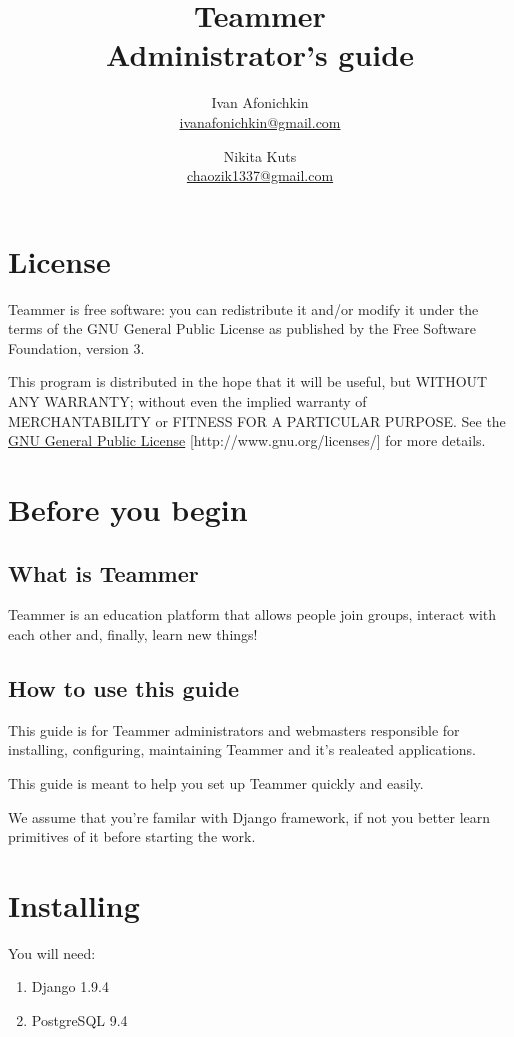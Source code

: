 \documentclass{report}
\author{Ivan Afonichkin \\ \href{mailto:ivanafonichkin@gmail.com}{ivanafonichkin@gmail.com} 
   \and Nikita Kuts \\ \href{mailto:chaozik1337@gmail.com}{chaozik1337@gmail.com} }
\title{Teammer \\ Administrator's guide}
\begin{document}
\maketitle
\tableofcontents

\section{License}
Teammer is free software: you can redistribute it and/or modify
it under the terms of the GNU General Public License as published by
the Free Software Foundation, version 3.

This program is distributed in the hope that it will be useful, but WITHOUT ANY WARRANTY; without even the implied warranty of MERCHANTABILITY or FITNESS FOR A PARTICULAR PURPOSE.  See the \href{http://www.gnu.org/licenses/}{GNU General Public License} [http://www.gnu.org/licenses/] for more details.

\section{Before you begin}
\subsection{What is Teammer}

Teammer is an education platform that allows people join groups, interact with each other and, finally, learn new things!

\subsection{How to use this guide}
This guide is for Teammer administrators and webmasters responsible for installing, configuring, maintaining Teammer and it’s realeated applications.

This guide is meant to help you set up Teammer quickly and easily.

We assume that you’re familar with Django framework, if not you better learn primitives of it before starting the work.

\section{Installing}
You will need:

\begin{enumerate}
\item Django 1.9.4
\item PostgreSQL 9.4
\end{enumerate}
\end{document}
